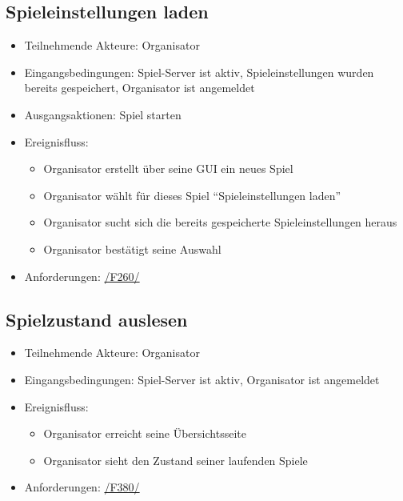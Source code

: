 \documentclass[a4paper]{scrreprt}
\begin{document}
    \subsection{Spieleinstellungen laden}
    \begin{itemize}
        \item Teilnehmende Akteure: \Gls{Organisator}
        \item Eingangsbedingungen: \Gls{Spiel-Server} ist aktiv, \Gls{Spieleinstellungen} wurden bereits gespeichert, \Gls{Organisator} ist angemeldet
        \item Ausgangsaktionen: \Gls{Spiel} starten
        \item Ereignisfluss:
        \begin{itemize}
            \item \Gls{Organisator} erstellt über seine GUI ein neues Spiel
            \item \Gls{Organisator} wählt für dieses \Gls{Spiel} \enquote{Spieleinstellungen laden}
            \item \Gls{Organisator} sucht sich die bereits gespeicherte \Gls{Spieleinstellungen} heraus
            \item \Gls{Organisator} bestätigt seine Auswahl
        \end{itemize}
        \item Anforderungen: \hyperlink{F260}{/F260/}
    \end{itemize}

 \subsection{Spielzustand auslesen}
	\begin{itemize}
		\item Teilnehmende Akteure: \Gls{Organisator}
		\item Eingangsbedingungen: \Gls{Spiel-Server} ist aktiv, \Gls{Organisator} ist angemeldet
		\item Ereignisfluss:
		\begin{itemize}
			\item \Gls{Organisator} erreicht seine Übersichtsseite
			\item \Gls{Organisator} sieht den Zustand seiner laufenden Spiele
		\end{itemize}
        \item Anforderungen: \hyperlink{F380}{/F380/}
	\end{itemize}
\end{document}
